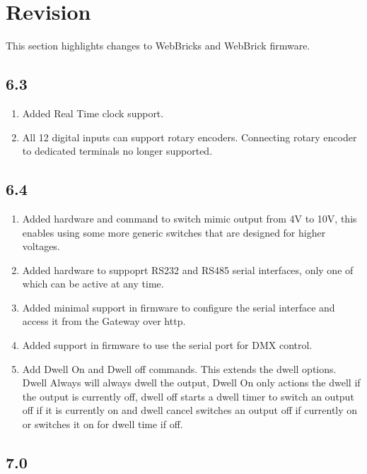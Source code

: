 \section{Revision}

This section highlights changes to WebBricks and WebBrick firmware.

\subsection{6.3}

\begin{enumerate}
\item
Added Real Time clock support.
\item
All 12 digital inputs can support rotary encoders. Connecting rotary encoder to dedicated terminals no longer supported.
\end{enumerate}

\subsection{6.4}

\begin{enumerate}
\item
Added hardware and command to switch mimic output from 4V to 10V, this enables using some more generic switches that are designed for 
higher voltages.

\item
Added hardware to suppoprt RS232 and RS485 serial interfaces, only one of which can be active at any time.

\item
Added minimal support in firmware to configure the serial interface and access it from the Gateway over http.

\item
Added support in firmware to use the serial port for DMX control.

\item
Add Dwell On and Dwell off commands. This extends the dwell options. Dwell Always will always dwell the output, Dwell On only actions the dwell 
if the output is currently off, dwell off starts a dwell timer to switch an output off if it is currently on and dwell cancel switches an output
off if currently on or switches it on for dwell time if off.

\end{enumerate}
\subsection{7.0}

